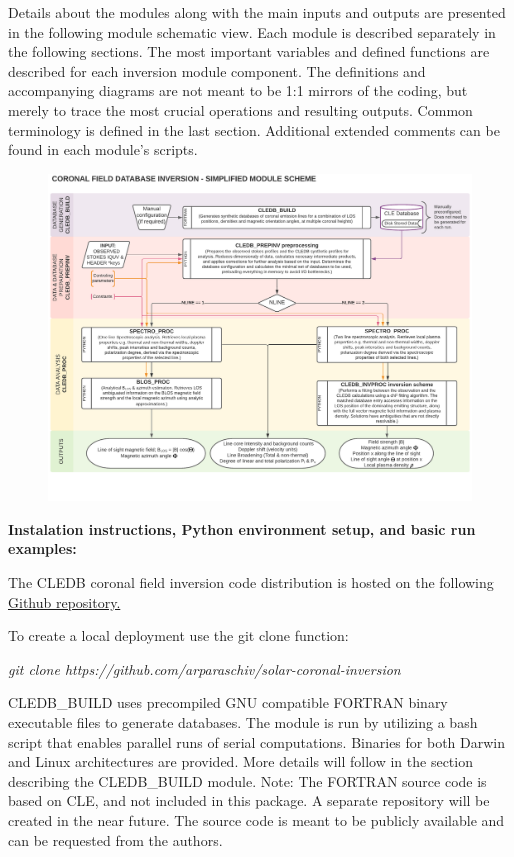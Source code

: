 \documentclass{article}
\begin{document}
 Details about the modules along with the main inputs and outputs are presented in the following module schematic view. Each module is described separately in the following sections. The most important variables and defined functions are described for each inversion module component. The definitions and accompanying diagrams are not meant to be 1:1 mirrors of the coding, but merely to trace the most crucial operations and resulting outputs. Common terminology is defined in the last section. Additional extended comments can be found in each module's scripts.

\begin{figure}[!p]
\vspace{-1cm}\hspace{-2cm}\includegraphics[angle=-90,width=1.1\columnwidth]{figs/1_CLEDB_OVERVIEW.pdf}
\end{figure} 


\newpage

\textbf{\large Instalation instructions, Python environment setup, and basic run examples:}

The CLEDB coronal field inversion code distribution is hosted on the following \href{https://github.com/arparaschiv/solar-coronal-inversion}{Github repository.} 

To create a local deployment use the git clone function:

\emph{\color{red} git clone https://github.com/arparaschiv/solar-coronal-inversion}

CLEDB\_BUILD uses precompiled GNU compatible FORTRAN binary executable files to generate databases. The module is run by utilizing a bash script that enables parallel runs of serial computations. Binaries for both Darwin and Linux architectures are provided. More details will follow in the section describing the CLEDB\_BUILD module.
Note: The FORTRAN source code is based on CLE, and not included in this package. A separate repository will be created in the near future. The source code is meant to be publicly available and can be requested from the authors.
\end{document}
